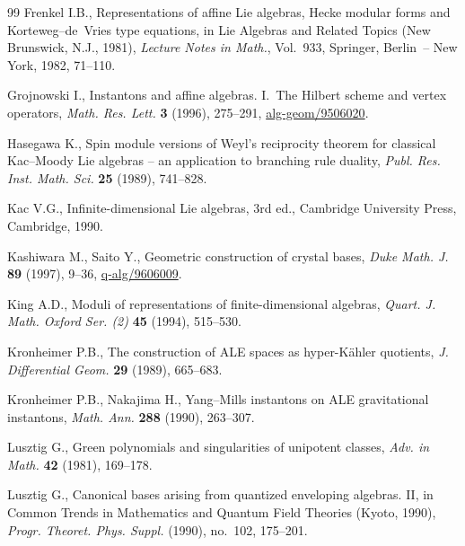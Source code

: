 \documentclass[10pt,a4paper]{amsart}
\theoremstyle{definition}
\numberwithin{equation}{section}
\begin{document}
\begin{thebibliography}{99}
 Frenkel I.B., Representations of af\/f\/ine {L}ie algebras, {H}ecke modular
  forms and {K}orteweg--de~{V}ries type equations, in Lie Algebras and Related
  Topics ({N}ew {B}runswick, {N}.{J}., 1981), {\it Lecture Notes in Math.}, Vol.~933,
  Springer, Berlin~-- New York, 1982, 71--110. %

Grojnowski I., Instantons and af\/f\/ine algebras. I.~The Hilbert
  scheme and vertex operators, {\it Math. Res. Lett.} \textbf{3} (1996),  275--291,
  \href{http://arxiv.org/abs/alg-geom/9506020}{alg-geom/9506020}. %

Hasegawa K., Spin module versions of Weyl's reciprocity theorem for
  classical Kac--Moody Lie algebras -- an application to branching rule
  duality, {\it Publ. Res. Inst. Math. Sci.} \textbf{25} (1989),  741--828.

 Kac V.G., Inf\/inite-dimensional Lie algebras, 3rd ed., Cambridge
  University Press, Cambridge, 1990. %

Kashiwara M., Saito Y., Geometric construction of crystal bases, {\it Duke
  Math. J.} \textbf{89} (1997),  9--36,  \mbox{\href{http://arxiv.org/abs/q-alg/9606009}{q-alg/9606009}}. %

 King A.D.,  Moduli of representations of f\/inite-dimensional algebras,
 {\it Quart. J. Math. Oxford Ser. (2)} \textbf{45} (1994),  515--530.

 Kronheimer P.B.,  The construction of {ALE} spaces as hyper-{K}\"ahler
  quotients, {\it J. Differential Geom.} \textbf{29} (1989),    665--683.

 Kronheimer P.B., Nakajima H., Yang--Mills instantons on {ALE}
  gravitational instantons, {\it Math. Ann.} \textbf{288} (1990),   263--307.

Lusztig G.,  Green polynomials and singularities of unipotent classes,
 {\it  Adv. in Math.} \textbf{42} (1981),  169--178. %

Lusztig G.,  Canonical bases arising from quantized enveloping algebras.
  II, in Common
  Trends in Mathematics and Quantum Field Theories (Kyoto, 1990),
  {\it Progr. Theoret. Phys. Suppl.} (1990), no.~102, 175--201. %


\end{thebibliography}
\end{document}
